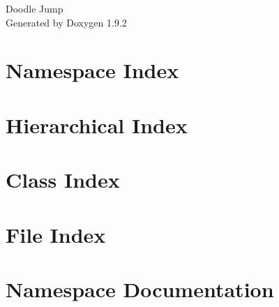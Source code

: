 \documentclass[twoside]{book}
\newcommand{\+}{\discretionary{\mbox{\scriptsize$\hookleftarrow$}}{}{}}
\newcommand{\clearemptydoublepage}{%
    \newpage{\pagestyle{empty}\cleardoublepage}%
  }
\begin{document}
  \raggedbottom
    \hypersetup{pageanchor=false,
                bookmarksnumbered=true,
                pdfencoding=unicode
               }
  \begin{titlepage}
  \vspace*{7cm}
  \begin{center}%
  {\Large Doodle Jump}\\
  \vspace*{1cm}
  {\large Generated by Doxygen 1.9.2}\\
  \end{center}
  \end{titlepage}
  \clearemptydoublepage
  \tableofcontents
  \clearemptydoublepage
  \hypersetup{pageanchor=true}
\chapter{Namespace Index}

\chapter{Hierarchical Index}

\chapter{Class Index}

\chapter{File Index}

\chapter{Namespace Documentation}








\end{document}
